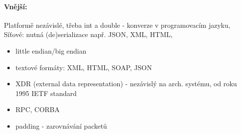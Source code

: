 \paragraph{Vnější:} Platformě nezávislé, třeba int a double - konverze v programovacím jazyku, Síťové: nutná (de)serializace např. JSON, XML, HTML,

\begin{itemize}[itemsep=0px]
\item little endian/big endian
\item textové formáty: XML, HTML, SOAP, JSON
\item XDR (external data representation) - nezávislý na arch. systému, od roku 1995 IETF standard
\item RPC, CORBA
\item padding - zarovnávání packetů
\end{itemize}